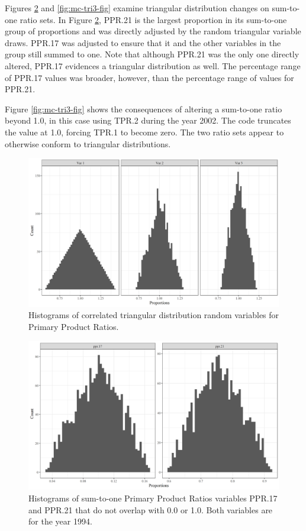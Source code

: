 \documentclass[
  openany]{book}
\begin{document}
Figures \ref{fig:mc-tri2-fig} and \ref{fig:mc-tri3-fig} examine triangular distribution changes on sum-to-one ratio sets. In Figure \ref{fig:mc-tri2-fig}, PPR.21 is the largest proportion in its sum-to-one group of proportions and was directly adjusted by the random triangular variable draws. PPR.17 was adjusted to ensure that it and the other variables in the group still summed to one. Note that although PPR.21 was the only one directly altered, PPR.17 evidences a triangular distribution as well. The percentage range of PPR.17 values was broader, however, than the percentage range of values for PPR.21.

Figure \ref{fig:mc-tri3-fig} shows the consequences of altering a sum-to-one ratio beyond 1.0, in this case using TPR.2 during the year 2002. The code truncates the value at 1.0, forcing TPR.1 to become zero. The two ratio sets appear to otherwise conform to triangular distributions.

\begin{figure}
\includegraphics[width=1\linewidth]{images/triang1} \caption{Histograms of correlated triangular distribution random variables for Primary Product Ratios.}\label{fig:mc-tri1-fig}
\end{figure}

\begin{figure}
\includegraphics[width=1\linewidth]{images/triang2} \caption{Histograms of sum-to-one Primary Product Ratios variables PPR.17 and PPR.21 that do not overlap with 0.0 or 1.0.  Both variables are for the year 1994.}\label{fig:mc-tri2-fig}
\end{figure}
\end{document}
